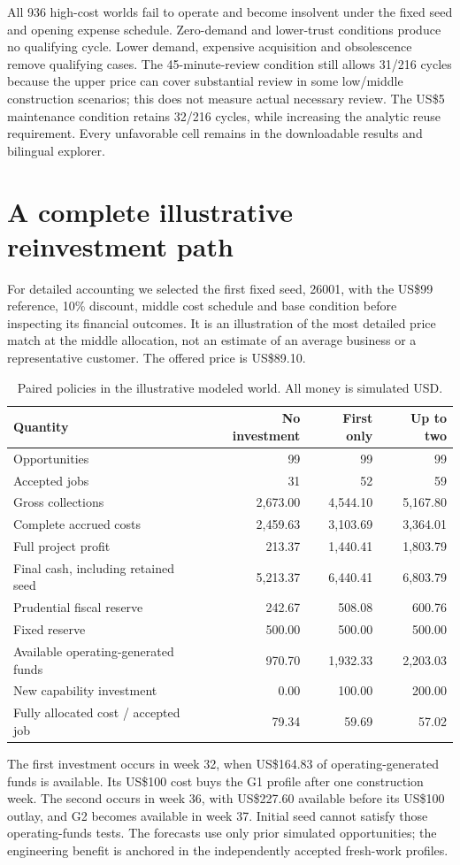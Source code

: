\documentclass[11pt,letterpaper]{article}
\newcommand{\usd}[1]{US\$#1}
\begin{document}
All 936 high-cost worlds fail to operate and become insolvent under the fixed seed and opening expense schedule. Zero-demand and lower-trust conditions produce no qualifying cycle. Lower demand, expensive acquisition and obsolescence remove qualifying cases. The 45-minute-review condition still allows 31/216 cycles because the upper price can cover substantial review in some low/middle construction scenarios; this does not measure actual necessary review. The \usd{5} maintenance condition retains 32/216 cycles, while increasing the analytic reuse requirement. Every unfavorable cell remains in the downloadable results and bilingual explorer.

\section{A complete illustrative reinvestment path}
For detailed accounting we selected the first fixed seed, 26001, with the \usd{99} reference, 10\% discount, middle cost schedule and base condition before inspecting its financial outcomes. It is an illustration of the most detailed price match at the middle allocation, not an estimate of an average business or a representative customer. The offered price is \usd{89.10}.

\begin{table}[htbp]\small
\caption{Paired policies in the illustrative modeled world. All money is simulated USD.}
\begin{tabularx}{\linewidth}{@{}Yrrr@{}}
\toprule
Quantity & No investment & First only & Up to two \\
\midrule
Opportunities & 99 & 99 & 99 \\
Accepted jobs & 31 & 52 & 59 \\
Gross collections & 2,673.00 & 4,544.10 & 5,167.80 \\
Complete accrued costs & 2,459.63 & 3,103.69 & 3,364.01 \\
Full project profit & 213.37 & 1,440.41 & 1,803.79 \\
Final cash, including retained seed & 5,213.37 & 6,440.41 & 6,803.79 \\
Prudential fiscal reserve & 242.67 & 508.08 & 600.76 \\
Fixed reserve & 500.00 & 500.00 & 500.00 \\
Available operating-generated funds & 970.70 & 1,932.33 & 2,203.03 \\
New capability investment & 0.00 & 100.00 & 200.00 \\
Fully allocated cost / accepted job & 79.34 & 59.69 & 57.02 \\
\bottomrule
\end{tabularx}
\label{tab:case}
\end{table}
The first investment occurs in week 32, when \usd{164.83} of operating-generated funds is available. Its \usd{100} cost buys the G1 profile after one construction week. The second occurs in week 36, with \usd{227.60} available before its \usd{100} outlay, and G2 becomes available in week 37. Initial seed cannot satisfy those operating-funds tests. The forecasts use only prior simulated opportunities; the engineering benefit is anchored in the independently accepted fresh-work profiles.
\end{document}
